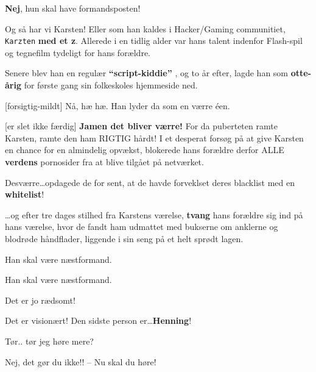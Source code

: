 \documentclass[a4paper,11pt]{article}
\begin{document}
\begin{sketch}
 \textbf{Nej}, hun skal have formandsposten!


 Og så har vi Karsten! Eller som han kaldes i Hacker/Gaming communitiet, \texttt{Karzten} \textbf{med et z}.  Allerede i en tidlig alder var hans talent indenfor Flash-spil og tegnefilm tydeligt for hans forældre.

 Senere blev han en regulær \textbf{``script-kiddie''} , og to år efter, lagde han som \textbf{otte-årig} for første gang sin folkeskoles hjemmeside ned.

[forsigtig-mildt] Nå, hæ hæ. Han lyder da som en værre éen.

[er slet ikke færdig] \textbf{Jamen det bliver værre!} For da puberteten ramte Karsten, ramte den ham RIGTIG hårdt!  I et desperat forsøg på at give Karsten en chance for en almindelig opvækst, blokerede hans forældre derfor ALLE \textbf{verdens} pornosider fra at blive tilgået på netværket.


 Desværre\ldots opdagede de for sent, at de havde forveklset deres blacklist med en \textbf{whitelist}!


 \ldots og efter tre dages stilhed fra Karstens værelse, \textbf{tvang} hans forældre sig ind på hans værelse, hvor de fandt ham udmattet med bukserne om anklerne og blodrøde håndflader, liggende i sin seng på et helt sprødt lagen.


 Han skal være næstformand.


 Han skal være næstformand.

 Det er jo rædsomt!

 Det er visionært! Den sidste person er\ldots \textbf{Henning}!


 Tør.. tør jeg høre mere?

 Nej, det gør du ikke!! -- Nu skal du høre!



\end{sketch}
\end{document}

